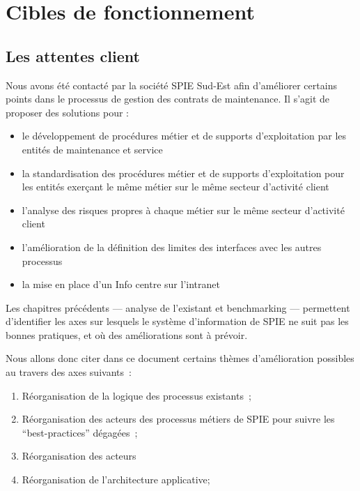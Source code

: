 \chapter{Cibles de fonctionnement}

\section{Les attentes client}

Nous avons été contacté par la société SPIE Sud-Est afin d'améliorer certains points dans le processus de gestion des contrats de maintenance. Il s'agit de proposer des solutions pour :

\begin{itemize}
    \item le développement de procédures métier et de supports d'exploitation par les entités de maintenance et service
    \item la standardisation des procédures métier et de supports d'exploitation pour les entités exerçant le même métier sur le même secteur d'activité client
    \item l'analyse des risques propres à chaque métier sur le même secteur d'activité client
    \item l'amélioration de la définition des limites des interfaces avec les autres processus
    \item la mise en place d'un Info centre sur l'intranet
\end{itemize}

Les chapitres précédents --- analyse de l'existant et benchmarking --- permettent d'identifier les axes sur lesquels le système d'information de SPIE ne suit pas les bonnes pratiques, et où des améliorations sont à prévoir.

    Nous allons donc citer dans ce document certains thèmes d'amélioration possibles au travers des axes suivants~:

    \begin{enumerate}
        \item Réorganisation de la logique des processus existants~;
        \item Réorganisation des acteurs des processus métiers de SPIE pour suivre les ``best-practices'' dégagées~;
        \item Réorganisation des acteurs
        \item Réorganisation de l'architecture applicative;
    \end{enumerate}


